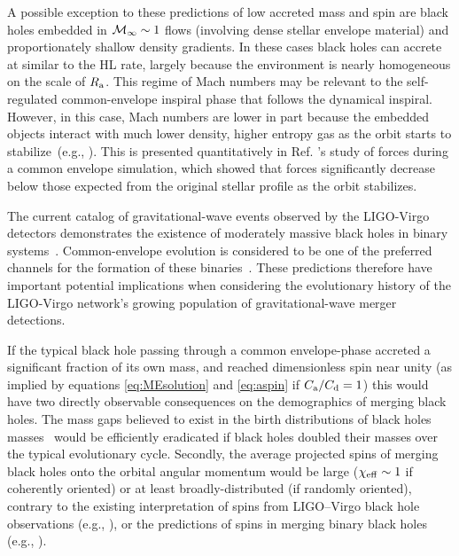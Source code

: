 A possible exception to these predictions of low accreted mass and spin are black holes embedded in ${\cal M}_\infty \sim 1$ flows (involving dense stellar envelope material) and proportionately shallow density gradients. In these cases black holes can accrete at similar to the HL rate, largely because the environment is nearly homogeneous on the scale of $R_{\rm a}$. This regime of Mach numbers may be relevant to the self-regulated common-envelope inspiral phase that follows the dynamical inspiral. However, in this case, Mach numbers are lower in part because the embedded objects interact with  much lower density, higher entropy gas as the orbit starts to stabilize~(e.g., \cite{Ohlmann:2016b,Ivanova:2016, Iaconi:2018,Chamandy:2019psk}). This is presented quantitatively in Ref. \cite{Chamandy:2019psk}'s study of forces during a common envelope simulation, which showed that forces significantly decrease below those expected from the original stellar profile as the orbit stabilizes. 

The current catalog of gravitational-wave events observed by the LIGO-Virgo detectors demonstrates the existence of moderately massive black holes in binary systems~\cite{Abbott:2016blz,TheLIGOScientific:2016pea,Nitz:2018imz,Nitz:2019hdf,Biwer:2018osg,Abbott:2017vtc,Abbott:2017gyy,Abbott:2017oio,Zackay:2019tzo,Venumadhav:2019lyq,LIGOScientific:2018mvr,De:2018zrk}. Common-envelope evolution is considered to be one of the preferred channels for the formation of these binaries~\cite{Kruckow:2016tti,Belczynski:2016obo,EldridgeStanway:2016,Stevenson:2017,Mapelli:2018}. These predictions therefore have important potential implications when considering the evolutionary history of the LIGO-Virgo network's growing population of gravitational-wave merger detections. 

If the typical black hole passing through a common envelope-phase accreted a significant fraction of its own mass, and reached dimensionless spin near unity (as implied by equations \eqref{eq:MEsolution} and \eqref{eq:aspin} if $C_{\rm a}/C_{\rm d}=1$) this would have two directly observable consequences on the demographics of merging black holes. The mass gaps believed to exist in the birth distributions of black holes masses~\cite{Bailyn:1998,Kreidberg:2012,Ozel:2010,Farr:2011,Yusof:2013,Belczynski:2014,Marchant:2016,Woosley:2017} would be efficiently eradicated if black holes doubled their masses over the typical evolutionary cycle. Secondly, the average projected spins of merging black holes onto the orbital angular momentum would be large ($\chi_{\rm eff}\sim 1$ if coherently oriented) or at least broadly-distributed (if randomly oriented), contrary to the existing interpretation of spins from LIGO--Virgo black hole observations (e.g., \cite{Farr:2017uvj,Farr:2017gtv,Tiwari:2018qch,Piran_2019}), or the predictions of spins in merging binary black holes (e.g., \cite{Bavera:2019fkg,Fuller:2019sxi,Zaldarriaga:2017qkw,Kushnir:2016zee,Schroder:2018hxk,Batta:2019clm}). 

